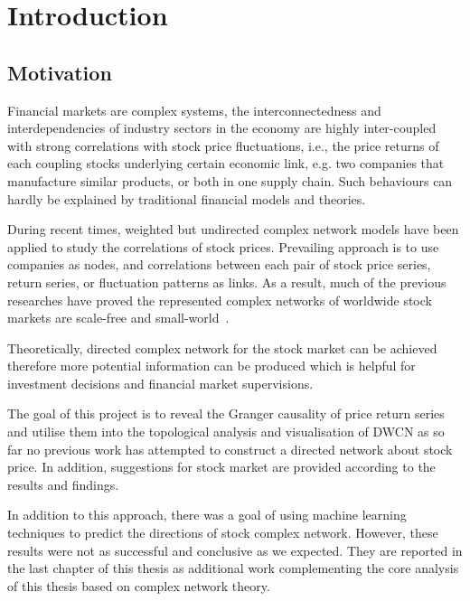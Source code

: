 \chapter{Introduction}
\section{Motivation}
Financial markets are complex systems, the interconnectedness and interdependencies of industry sectors in the economy are highly inter-coupled with strong correlations with stock price fluctuations, i.e., the price returns of each coupling stocks underlying certain economic link, e.g. two companies that manufacture similar products, or both in one supply chain. Such behaviours can hardly be explained by traditional financial models and theories.

During recent times, weighted but undirected complex network models have been applied to study the correlations of stock prices. Prevailing approach is to use companies as nodes, and correlations between each pair of stock price series, return series, or fluctuation patterns as links. As a result, much of the previous researches have proved the represented complex networks of worldwide stock markets are scale-free and small-world~\cite{cnsm, perspective}.

Theoretically, directed complex network for the stock market can be achieved therefore more potential information can be produced which is helpful for investment decisions and financial market supervisions. 



The goal of this project is to reveal the Granger causality of price return series and utilise them into the topological analysis and visualisation of DWCN as so far no previous work has attempted to construct a directed network about stock price. In addition, suggestions for stock market are provided according to the results and findings.

In addition to this approach, there was a goal of using machine learning techniques to predict the directions of stock complex network. However, these results were not as successful and conclusive as we expected. They are reported in the last chapter of this thesis as additional work complementing the core analysis of this thesis based on complex network theory.

